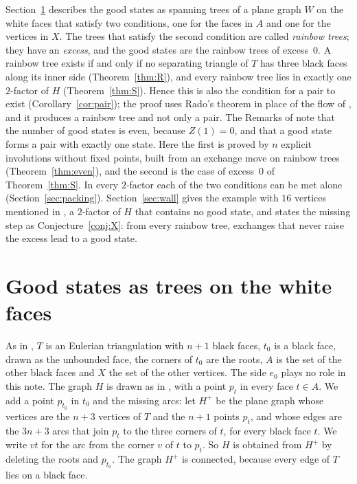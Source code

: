 \documentclass[10pt]{amsart}
\numberwithin{equation}{section}
\theoremstyle{definition}
\theoremstyle{remark}
\newcommand{\Hp}{H^{+}}
\begin{document}
Section~\ref{sec:trees} describes the good states as spanning trees of a plane graph $W$ on the white faces that satisfy two conditions, one for the faces in $A$ and one for the vertices in $X$.
The trees that satisfy the second condition are called \emph{rainbow trees}; they have an \emph{excess}, and the good states are the rainbow trees of excess~$0$.
A rainbow tree exists if and only if no separating triangle of $T$ has three black faces along its inner side (Theorem~\ref{thm:R}), and every rainbow tree lies in exactly one $2$-factor of $H$ (Theorem~\ref{thm:S}).
Hence this is also the condition for a pair to exist (Corollary~\ref{cor:pair}); the proof uses Rado's theorem in place of the flow of \cite[Section~4]{Paper}, and it produces a rainbow tree and not only a pair.
The Remarks of \cite{Paper} note that the number of good states is even, because $Z(1)=0$, and that a good state forms a pair with exactly one state.
Here the first is proved by $n$ explicit involutions without fixed points, built from an exchange move on rainbow trees (Theorem~\ref{thm:even}), and the second is the case of excess~$0$ of Theorem~\ref{thm:S}.
In every $2$-factor each of the two conditions can be met alone (Section~\ref{sec:packing}).
Section~\ref{sec:wall} gives the example with $16$ vertices mentioned in \cite{Paper}, a $2$-factor of $H$ that contains no good state, and states the missing step as Conjecture~\ref{conj:X}: from every rainbow tree, exchanges that never raise the excess lead to a good state.

\section{Good states as trees on the white faces}\label{sec:trees}

As in \cite[Sections~2 and~3]{Paper}, $T$ is an Eulerian triangulation with $n+1$ black faces, $t_0$ is a black face, drawn as the unbounded face, the corners of $t_0$ are the roots, $A$ is the set of the other black faces and $X$ the set of the other vertices.
The side $e_0$ plays no role in this note.
The graph $H$ is drawn as in \cite[Section~6]{Paper}, with a point $p_t$ in every face $t\in A$.
We add a point $p_{t_0}$ in $t_0$ and the missing arcs: let $\Hp$ be the plane graph whose vertices are the $n+3$ vertices of $T$ and the $n+1$ points $p_t$, and whose edges are the $3n+3$ arcs that join $p_t$ to the three corners of $t$, for every black face $t$.
We write $vt$ for the arc from the corner $v$ of $t$ to $p_t$.
So $H$ is obtained from $\Hp$ by deleting the roots and $p_{t_0}$.
The graph $\Hp$ is connected, because every edge of $T$ lies on a black face.
\end{document}
